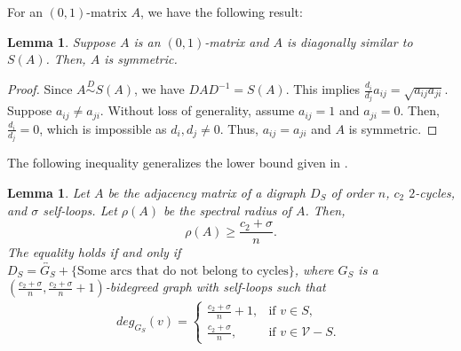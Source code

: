 \documentclass[12pt,a4paper,reqno]{amsart}
\numberwithin{equation}{section}
\theoremstyle{plain}
\newtheorem{lemma}[theorem]{Lemma}
\theoremstyle{definition}
\newcommand{\<}{\langle}
\renewcommand{\>}{\rangle}
\newcommand{\cV}{{\mathcal V}}
\begin{document}
    For an $(0,1)$-matrix $A$, we have the following result:

    \begin{lemma}
        \label{A_diagonal similar_SA}
        Suppose $A$ is an $(0,1)$-matrix and $A$ is diagonally similar to $S(A)$. Then, $A$ is symmetric. 
    \end{lemma}

    \begin{proof}
        Since $A \overset{D}{\sim} S(A)$, we have $DAD^{-1}=S(A)$. This implies $\frac{d_i}{d_j}a_{ij}=\sqrt{a_{ij}a_{ji}}$. Suppose $a_{ij}\neq a_{ji}$. Without loss of generality, assume $a_{ij}=1$ and $a_{ji}=0.$ Then, $\frac{d_i}{d_j}=0$, which is impossible as $d_i,d_j\neq 0$. Thus, $a_{ij}=a_{ji}$ and $A$ is symmetric.
    \end{proof}

    
    The following inequality generalizes the lower bound given in \cite{gudino2010lowerboundofspectral}.
    \begin{lemma}
        \label{lemmalowerbound_p}
        Let $A$ be the adjacency matrix of a digraph $D_S$ of order $n$, $c_2$ $2$-cycles, and $\sigma$ self-loops. Let $\rho(A)$ be the spectral radius of $A$. Then, 
        \begin{equation}
            \label{eqlowerbound_p}
            \rho(A) \geq \frac{c_2+\sigma}{n}.
        \end{equation}        
        The equality holds if and only if $D_S=\overleftrightarrow{G_S}+ \text{\{Some arcs that do not belong to cycles\}}$, where $G_S$ is a $(\frac{c_2+\sigma}{n},\frac{c_2+\sigma}{n}+1) $-bidegreed graph with self-loops such that
        \begin{align*}
            deg_{G_S}(v)= 
            \begin{cases}
	\frac{c_2+\sigma}{n}+1, &\text{if $v\in S$} ,\\
	\frac{c_2+\sigma}{n}, &\text{if $v \in \cV-S$. }
            \end{cases}
        \end{align*}
    \end{lemma}
\end{document}
